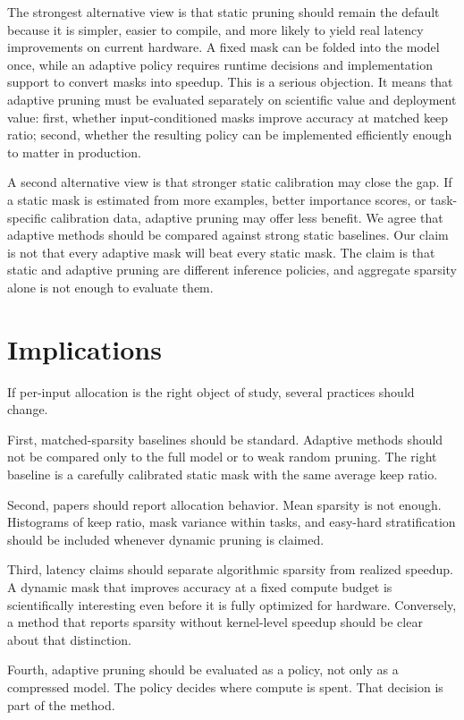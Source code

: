 \documentclass{article}
\begin{document}
The strongest alternative view is that static pruning should remain the default
because it is simpler, easier to compile, and more likely to yield real latency
improvements on current hardware. A fixed mask can be folded into the model
once, while an adaptive policy requires runtime decisions and implementation
support to convert masks into speedup. This is a serious objection. It means
that adaptive pruning must be evaluated separately on scientific value and
deployment value: first, whether input-conditioned masks improve accuracy at
matched keep ratio; second, whether the resulting policy can be implemented
efficiently enough to matter in production.

A second alternative view is that stronger static calibration may close the
gap. If a static mask is estimated from more examples, better importance
scores, or task-specific calibration data, adaptive pruning may offer less
benefit. We agree that adaptive methods should be compared against strong
static baselines. Our claim is not that every adaptive mask will beat every
static mask. The claim is that static and adaptive pruning are different
inference policies, and aggregate sparsity alone is not enough to evaluate
them.

\section{Implications}

If per-input allocation is the right object of study, several practices should
change.

First, matched-sparsity baselines should be standard. Adaptive methods should
not be compared only to the full model or to weak random pruning. The right
baseline is a carefully calibrated static mask with the same average keep
ratio.

Second, papers should report allocation behavior. Mean sparsity is not enough.
Histograms of keep ratio, mask variance within tasks, and easy-hard
stratification should be included whenever dynamic pruning is claimed.

Third, latency claims should separate algorithmic sparsity from realized
speedup. A dynamic mask that improves accuracy at a fixed compute budget is
scientifically interesting even before it is fully optimized for hardware.
Conversely, a method that reports sparsity without kernel-level speedup should
be clear about that distinction.

Fourth, adaptive pruning should be evaluated as a policy, not only as a
compressed model. The policy decides where compute is spent. That decision is
part of the method.
\end{document}
